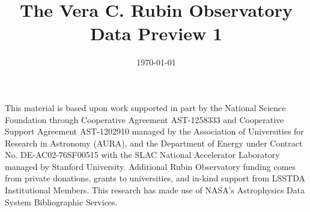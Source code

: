 \documentclass[twocolappendix,linenumbers,trackchanges]{aastex7}
\begin{document}
\date{\today}
\title{The Vera C. Rubin Observatory Data Preview 1}
















\begin{acknowledgments}
This material is based upon work supported in part by the National Science Foundation through Cooperative Agreement AST-1258333 and Cooperative Support Agreement AST-1202910 managed by the Association of Universities for Research in Astronomy (AURA), and the Department of Energy under Contract No. DE-AC02-76SF00515 with the SLAC National Accelerator Laboratory managed by Stanford University.
Additional Rubin Observatory funding comes from private donations, grants to universities, and in-kind support from LSSTDA Institutional Members.
This research has made use of NASA's Astrophysics Data System Bibliographic Services.

\end{acknowledgments}
\vspace{5mm}



\appendix
\printglossaries



\end{document}
